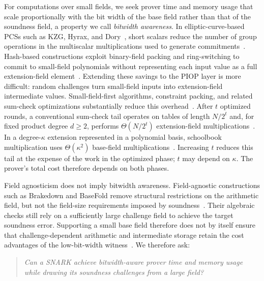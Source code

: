 For computations over small fields, we seek prover time and
memory usage that scale proportionally with the bit width of the base field
rather than that of the soundness field, a property we call
\emph{bitwidth awareness}.
In elliptic-curve-based PCSs such as KZG, Hyrax, and
Dory~\cite{asiacrypt/KateZG10,sp/WahbyTSTW18,tcc/Lee21},
short scalars reduce the number of group operations in the
multiscalar multiplications used to generate
commitments~\cite{eurocrypt/SettyTW24}.
Hash-based constructions exploit binary-field packing and
ring-switching to commit to small-field polynomials without
representing each input value as a full extension-field
element~\cite{eurocrypt/DiamondP25,eurocrypt/DiamondP26}.
Extending these savings to the PIOP layer is more difficult:
random challenges turn small-field inputs into extension-field
intermediate values.
Small-field-first algorithms, constraint packing, and related
sum-check optimizations substantially reduce this
overhead~\cite{iacr/BagadDT24,iacr/DaoT24,iacr/Gruen24,%
iacr/BagadDDT25,iacr/DaoDBDT26}.
After \(t\) optimized rounds, a conventional sum-check tail
operates on tables of length \(N/2^t\) and, for fixed product
degree \(d\geq2\), performs \(\Theta(N/2^t)\) extension-field
multiplications~\cite{crypto/Thaler13,iacr/BagadDT24}.
In a degree-\(\kappa\) extension represented in a polynomial basis,
schoolbook multiplication uses \(\Theta(\kappa^2)\) base-field
multiplications~\cite{iacr/BagadDT24}.
Increasing \(t\) reduces this tail at the expense of the work
in the optimized phase; \(t\) may depend on \(\kappa\).
The prover's total cost therefore depends on both phases.

Field agnosticism does not imply bitwidth awareness.
Field-agnostic constructions such as Brakedown and BaseFold
remove structural restrictions on the arithmetic field, but not
the field-size requirements imposed by
soundness~\cite{crypto/GolovnevLSTW23,crypto/ZeilbergerCF24}.
Their algebraic checks still rely on a sufficiently large
challenge field to achieve the target soundness error.
Supporting a small base field therefore does not by itself
ensure that challenge-dependent arithmetic and intermediate
storage retain the cost advantages of the low-bit-width witness~\cite{eurocrypt/DiamondP26,iacr/BagadDDT25}.
We therefore ask:
\begin{quote}
\emph{Can a SNARK achieve bitwidth-aware prover time and memory
usage while drawing its soundness challenges from a large field?}
\end{quote}

